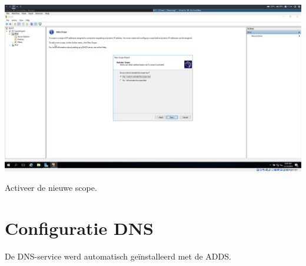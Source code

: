 \documentclass[a4paper]{article}
\begin{document}
\begin{center}
	\includegraphics[width=15cm]{Pictures/DC1/DHCP/1542300248.png}
	
	Activeer de nieuwe scope.
\end{center}


\section{Configuratie DNS}
De DNS-service werd automatisch geïnstalleerd met de ADDS.
\end{document}
